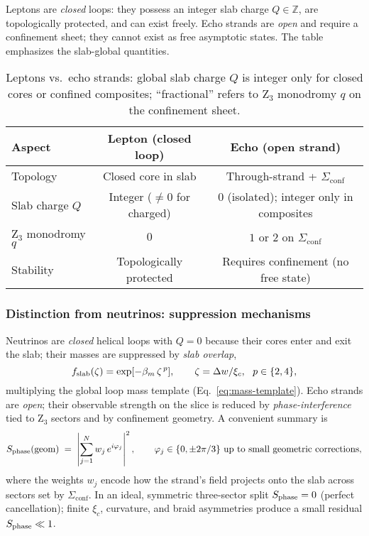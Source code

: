Leptons are \emph{closed} loops: they possess an integer slab charge $Q\in\mathbb Z$, are topologically protected, and can exist freely. Echo strands are \emph{open} and require a confinement sheet; they cannot exist as free asymptotic states. The table emphasizes the slab-global quantities.

\begin{table}[h!]
\centering
\begin{tabular}{|l|c|c|}
\hline
Aspect & Lepton (closed loop) & Echo (open strand) \\
\hline
Topology & Closed core in slab & Through-strand + $\Sigma_{\mathrm{conf}}$ \\
Slab charge $Q$ & Integer ($\neq 0$ for charged) & $0$ (isolated); integer only in composites \\
Z$_3$ monodromy $q$ & $0$ & $1$ or $2$ on $\Sigma_{\mathrm{conf}}$ \\
Stability & Topologically protected & Requires confinement (no free state) \\
\hline
\end{tabular}
\caption{Leptons vs.\ echo strands: global slab charge $Q$ is integer only for closed cores or confined composites; ``fractional'' refers to Z$_3$ monodromy $q$ on the confinement sheet.}
\label{tab:echo-lepton-revised}
\end{table}

\subsubsection{Distinction from neutrinos: suppression mechanisms}
\label{sec:echo:vs-neutrinos}

Neutrinos are \emph{closed} helical loops with $Q=0$ because their cores enter and exit the slab; their masses are suppressed by \emph{slab overlap},
\[
f_{\rm slab}(\zeta)=\exp[-\beta_m\,\zeta^{\,p}],\qquad \zeta=\Delta w/\xi_c,\ \ p\in\{2,4\},
\]
multiplying the global loop mass template (Eq.~\eqref{eq:mass-template}). Echo strands are \emph{open}; their observable strength on the slice is reduced by \emph{phase-interference} tied to Z$_3$ sectors and by confinement geometry. A convenient summary is
\begin{equation}
S_{\rm phase}(\mathrm{geom}) \;=\; \left|\sum_{j=1}^{N} w_j\,e^{i\varphi_j}\right|^2,\qquad
\varphi_j\in\{0,\pm 2\pi/3\}\ \text{up to small geometric corrections},
\label{eq:Sphase}
\end{equation}
where the weights $w_j$ encode how the strand’s field projects onto the slab across sectors set by $\Sigma_{\mathrm{conf}}$. In an ideal, symmetric three-sector split $S_{\rm phase}=0$ (perfect cancellation); finite $\xi_c$, curvature, and braid asymmetries produce a small residual $S_{\rm phase}\ll1$.

